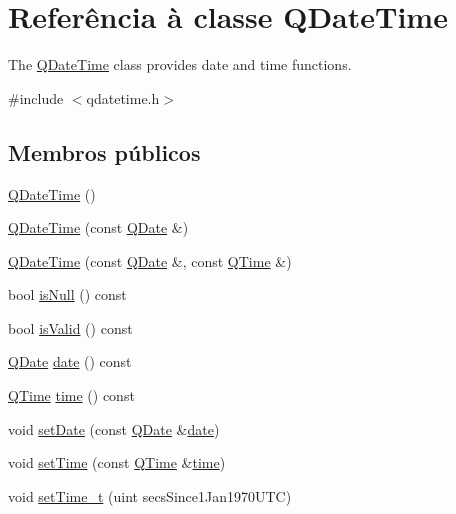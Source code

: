 \hypertarget{class_q_date_time}{\section{Referência à classe Q\-Date\-Time}
\label{class_q_date_time}
}


The \hyperlink{class_q_date_time}{Q\-Date\-Time} class provides date and time functions.  




{\ttfamily \#include $<$qdatetime.\-h$>$}

\subsection*{Membros públicos}
\begin{DoxyCompactItemize}
\item 
\hyperlink{class_q_date_time_a501ac29e4041e135e8abd360ffd34495}{Q\-Date\-Time} ()
\item 
\hyperlink{class_q_date_time_adc69d7d2a7fab69c78161f00efc939d2}{Q\-Date\-Time} (const \hyperlink{class_q_date}{Q\-Date} \&)
\item 
\hyperlink{class_q_date_time_a47c01471bb64d4242f1f8dcb05603e67}{Q\-Date\-Time} (const \hyperlink{class_q_date}{Q\-Date} \&, const \hyperlink{class_q_time}{Q\-Time} \&)
\item 
bool \hyperlink{class_q_date_time_ac02f2a4d7312eb91f40980adfd4e31b2}{is\-Null} () const 
\item 
bool \hyperlink{class_q_date_time_aac1b70a2ed67ead038c4d3f5ac4d8a81}{is\-Valid} () const 
\item 
\hyperlink{class_q_date}{Q\-Date} \hyperlink{class_q_date_time_a4528e95d53cf1e50ab2b5b3ef717fad5}{date} () const 
\item 
\hyperlink{class_q_time}{Q\-Time} \hyperlink{class_q_date_time_a825af88d1599b9f40f7619b5c3f3b702}{time} () const 
\item 
void \hyperlink{class_q_date_time_adb29ae3c034065e637729f3048cf7222}{set\-Date} (const \hyperlink{class_q_date}{Q\-Date} \&\hyperlink{class_q_date_time_a4528e95d53cf1e50ab2b5b3ef717fad5}{date})
\item 
void \hyperlink{class_q_date_time_afe14709c137acb27306b8816ea3560f3}{set\-Time} (const \hyperlink{class_q_time}{Q\-Time} \&\hyperlink{class_q_date_time_a825af88d1599b9f40f7619b5c3f3b702}{time})
\item 
void \hyperlink{class_q_date_time_a8b44ee35b1ceffe28b677504f516101f}{set\-Time\-\_\-t} (uint secs\-Since1\-Jan1970\-U\-T\-C)

\end{DoxyCompactItemize}
